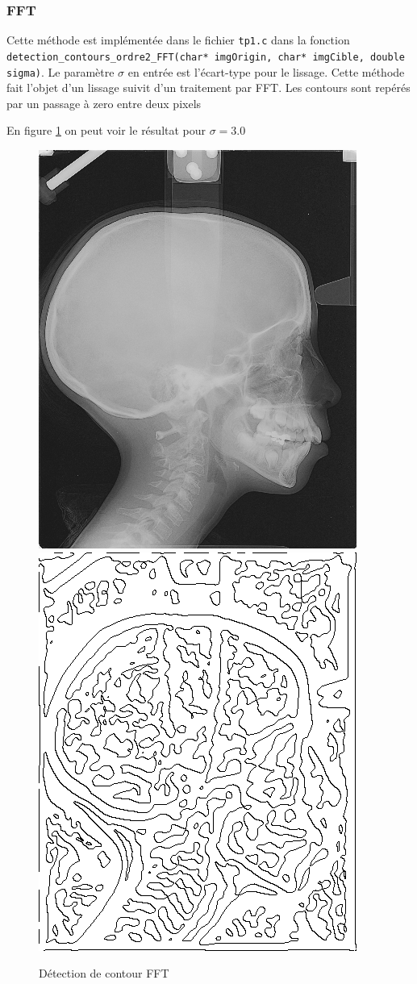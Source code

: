 \documentclass[paper=a4, fontsize=11pt]{scrartcl} %
\begin{document}
\subsubsection{FFT}
Cette méthode est implémentée dans le fichier \texttt{tp1.c} dans la fonction \\
 \texttt{detection\_contours\_ordre2\_FFT(char* imgOrigin, char* imgCible, double sigma)}. Le paramètre $\sigma$ en entrée est l'écart-type pour le lissage.
Cette méthode fait l'objet d'un lissage suivit d'un traitement par FFT. 
Les contours sont repérés par un passage à zero entre deux pixels

En figure \ref{FFavap} on peut voir le résultat pour $\sigma=3.0$

\begin{figure}[h!]
\centering
\caption{Détection de contour FFT}
	\label{FFavap}
	\includegraphics[scale=0.5]{images/rapport/radio1.png} 
	\includegraphics[scale=0.5]{images/rapport/coucou3.png}

\end{figure}
\end{document}
